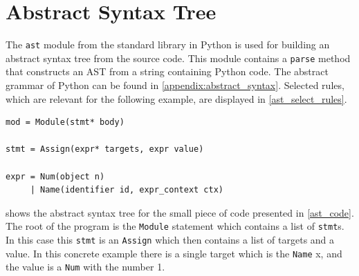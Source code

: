\section{Abstract Syntax Tree}\label{library:ast}
The \texttt{ast} module from the standard library in Python is used for building an abstract syntax tree from the source code.
This module contains a \texttt{parse} method that constructs an AST from a string containing Python code.
The abstract grammar of Python can be found in \cref{appendix:abstract_syntax}.
Selected rules, which are relevant for the following example, are displayed in \cref{ast_select_rules}.

\begin{lstlisting}[style=default, caption={Selected rules from the Python abstract grammar}, label={ast_select_rules}]
mod = Module(stmt* body)

stmt = Assign(expr* targets, expr value)

expr = Num(object n)
     | Name(identifier id, expr_context ctx)
\end{lstlisting}

 shows the abstract syntax tree for the small piece of code presented in \cref{ast_code}.
The root of the program is the \texttt{Module} statement which contains a list of \texttt{stmt}s.
In this case this \texttt{stmt} is an \texttt{Assign} which then contains a list of targets and a value.
In this concrete example there is a single target which is the \texttt{Name} x, and the value is a \texttt{Num} with the number 1.

